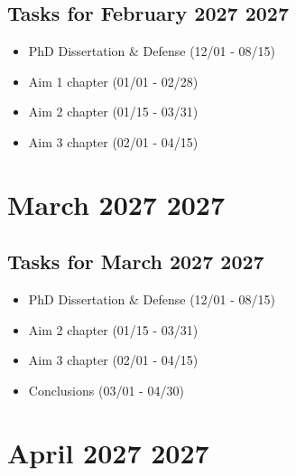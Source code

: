 \documentclass[landscape,a4paper]{article}
\begin{document}
\vspace{1cm}

\subsection*{Tasks for February 2027 2027}
\begin{itemize}
\item PhD Dissertation \& Defense (12/01 - 08/15)
\item Aim 1 chapter (01/01 - 02/28)
\item Aim 2 chapter (01/15 - 03/31)
\item Aim 3 chapter (02/01 - 04/15)
\end{itemize}
\newpage

\section*{March 2027 2027}

\begin{center}
\begin{tikzpicture}[scale=0.9]
\end{tikzpicture}
\end{center}

\vspace{1cm}

\subsection*{Tasks for March 2027 2027}
\begin{itemize}
\item PhD Dissertation \& Defense (12/01 - 08/15)
\item Aim 2 chapter (01/15 - 03/31)
\item Aim 3 chapter (02/01 - 04/15)
\item Conclusions (03/01 - 04/30)
\end{itemize}
\newpage

\section*{April 2027 2027}

\begin{center}
\begin{tikzpicture}[scale=0.9]
\end{tikzpicture}
\end{center}
\end{document}
